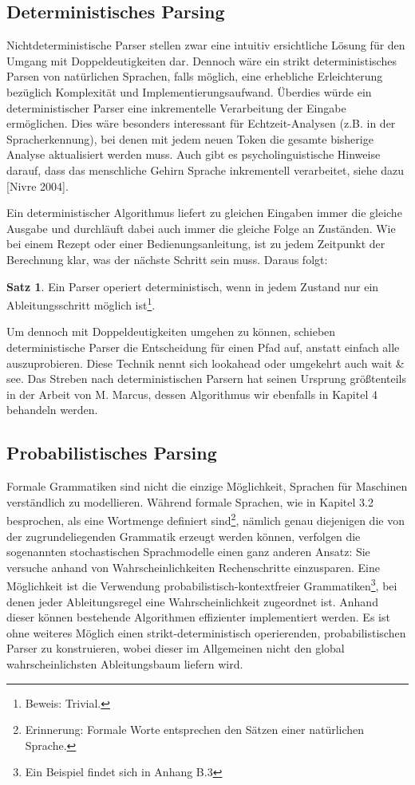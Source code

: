 \documentclass[12pt,a4paper]{article}
\theoremstyle{definition}
\begin{document}
	\subsection{Deterministisches Parsing}
		Nichtdeterministische Parser stellen zwar eine intuitiv ersichtliche Lösung für den Umgang mit Doppeldeutigkeiten dar. Dennoch wäre ein strikt deterministisches Parsen von natürlichen Sprachen, falls möglich, eine erhebliche Erleichterung bezüglich Komplexität und Implementierungsaufwand. Überdies würde ein deterministischer Parser eine inkrementelle Verarbeitung  der Eingabe ermöglichen. Dies wäre besonders interessant für Echtzeit-Analysen (z.B. in der Spracherkennung), bei denen mit jedem neuen Token die gesamte bisherige Analyse aktualisiert werden muss. Auch gibt es psycholinguistische Hinweise darauf, dass das menschliche Gehirn Sprache inkrementell verarbeitet, siehe dazu [Nivre 2004].
	
		Ein deterministischer Algorithmus liefert zu gleichen Eingaben immer die gleiche Ausgabe und durchläuft dabei auch immer die gleiche Folge an Zuständen. Wie bei einem Rezept oder einer Bedienungsanleitung, ist zu jedem Zeitpunkt der Berechnung klar, was der nächste Schritt sein muss. Daraus folgt:
	
			\newtheorem{det-parser}{Satz}[subsection]
			\begin{det-parser}
				Ein Parser operiert deterministisch, wenn in jedem Zustand nur ein Ableitungsschritt möglich ist\footnote{Beweis: Trivial.}.
			\end{det-parser}
	
		Um dennoch mit Doppeldeutigkeiten umgehen zu können, schieben deterministische Parser die Entscheidung für einen Pfad auf, anstatt einfach alle auszuprobieren. Diese Technik nennt sich lookahead oder umgekehrt auch wait \& see. Das Streben nach deterministischen Parsern hat seinen Ursprung größtenteils in der Arbeit von M. Marcus, dessen Algorithmus wir ebenfalls in Kapitel 4 behandeln werden.
	
	\subsection{Probabilistisches Parsing}
		Formale Grammatiken sind nicht die einzige Möglichkeit, Sprachen für Maschinen verständlich zu modellieren. Während formale Sprachen, wie in Kapitel 3.2 besprochen, als eine Wortmenge definiert sind\footnote{Erinnerung: Formale Worte entsprechen den Sätzen einer natürlichen Sprache.}, nämlich genau diejenigen die von der zugrundeliegenden Grammatik erzeugt werden können, verfolgen die sogenannten stochastischen Sprachmodelle einen ganz anderen Ansatz: Sie versuche anhand von Wahrscheinlichkeiten Rechenschritte einzusparen. Eine Möglichkeit ist die Verwendung probabilistisch-kontextfreier Grammatiken\footnote{Ein Beispiel findet sich in Anhang B.3}, bei denen jeder Ableitungsregel eine Wahrscheinlichkeit zugeordnet ist. Anhand dieser können bestehende Algorithmen effizienter implementiert werden. Es ist ohne weiteres Möglich einen strikt-deterministisch operierenden, probabilistischen Parser zu konstruieren, wobei dieser im Allgemeinen nicht den global wahrscheinlichsten Ableitungsbaum liefern wird.
	
\end{document}
